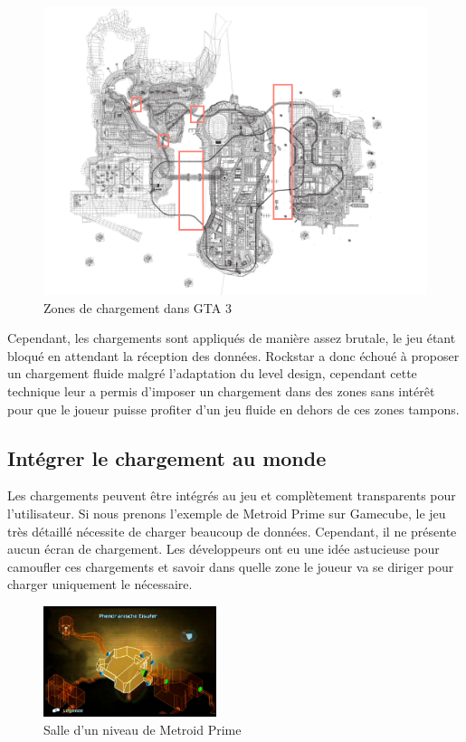 \documentclass[a4paper, 11pt]{article} %
\begin{document}
\begin{figure}[!h]%
\includegraphics[width=\columnwidth]{images/gta3_map.png}%
\caption{Zones de chargement dans GTA 3}%
\label{}%
\end{figure}

Cependant, les chargements sont appliqués de manière assez brutale, le jeu étant bloqué en attendant la réception des données. Rockstar a donc échoué à proposer un chargement fluide malgré l'adaptation du level design, cependant cette technique leur a permis d'imposer un chargement dans des zones sans intérêt pour que le joueur puisse profiter d'un jeu fluide en dehors de ces zones tampons.

\newpage
\subsection*{Intégrer le chargement au monde}
Les chargements peuvent être intégrés au jeu et complètement transparents pour l'utilisateur. Si nous prenons l'exemple de Metroid Prime sur Gamecube, le jeu très détaillé nécessite de charger beaucoup de données. Cependant, il ne présente aucun écran de chargement. Les développeurs ont eu une idée astucieuse pour camoufler ces chargements et savoir dans quelle zone le joueur va se diriger pour charger uniquement le nécessaire.

\begin{figure}
\begin{center}
\includegraphics[width=0.45\textwidth]{images/metroid-prime_map.png}
\end{center}
\caption{Salle d'un niveau de Metroid Prime}
\end{figure}
\end{document}

